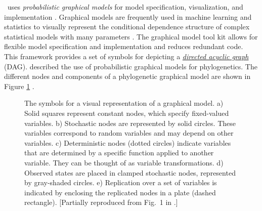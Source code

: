 \documentclass[11pt]{article}
\begin{document}
\RevBayes~uses \textit{probabilistic graphical models} for model specification, visualization, and implementation \citep{hoehnaGM2014}. 
Graphical models are frequently used in machine learning and statistics to visually represent the conditional dependence structure of complex statistical models with many parameters \citep{Gilks1994,lunn00,Jordan2004,Koller2009,Lunn2009}. 
The graphical model tool kit allows for flexible model specification and implementation and reduces redundant code. 
This framework provides a set of symbols for depicting a \href{http://en.wikipedia.org/wiki/Directed_acyclic_graph}{\textit{directed acyclic graph}} (DAG). 
\citet{hoehnaGM2014} described the use of probabilistic graphical models for phylogenetics. 
The different nodes and components of a phylogenetic graphical model are shown in Figure \ref{gmnotation} \citep[Fig. 1 from][]{hoehnaGM2014}. 
\begin{figure}[h!]
\centering
{}
\caption{\small The symbols for a visual representation of a graphical model. 
a) Solid squares represent constant nodes, which specify fixed-valued variables. 
b) Stochastic nodes are represented by solid circles. 
These variables correspond to random variables and may depend on other variables. 
c) Deterministic nodes (dotted circles) indicate variables that are determined by a specific function applied to another variable. 
They can be thought of as variable transformations. 
d) Observed states are placed in clamped stochastic nodes, represented by gray-shaded circles. e) Replication over a set of variables is indicated by enclosing the replicated nodes in a plate (dashed rectangle). 
[Partially reproduced from Fig.~1 in \citet{hoehnaGM2014}.]
}
\label{gmnotation}
\end{figure}
\end{document}
